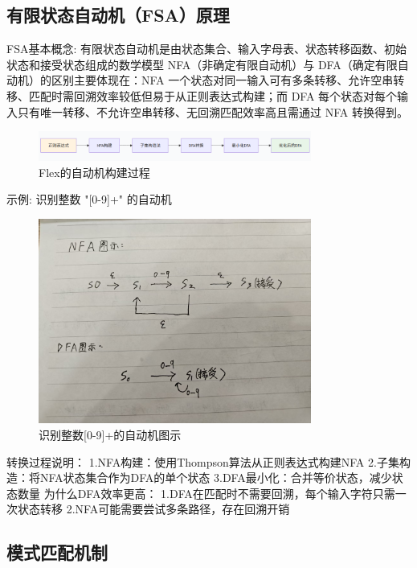 \documentclass[twocolumn]{article}
\begin{document}
\subsection{有限状态自动机（FSA）原理}

FSA基本概念: 有限状态自动机是由状态集合、输入字母表、状态转移函数、初始状态和接受状态组成的数学模型
NFA（非确定有限自动机）与 DFA（确定有限自动机）的区别主要体现在：NFA 一个状态对同一输入可有多条转移、允许空串转移、匹配时需回溯效率较低但易于从正则表达式构建；而 DFA 每个状态对每个输入只有唯一转移、不允许空串转移、无回溯匹配效率高且需通过 NFA 转换得到。

\begin{figure}[htbp]
    \centering
    \includegraphics[width=0.8\textwidth]{Flex_auto_create.png}
    \caption{Flex的自动机构建过程}
    \label{fig:flex_workflow}
\end{figure}

示例: 识别整数 "[0-9]+" 的自动机
\begin{figure}[htbp]
    \centering
    \includegraphics[width=0.8\textwidth]{example1.jpg}
    \caption{识别整数[0-9]+的自动机图示}
    \label{fig:example1}
\end{figure}
转换过程说明：
1.NFA构建：使用Thompson算法从正则表达式构建NFA
2.子集构造：将NFA状态集合作为DFA的单个状态
3.DFA最小化：合并等价状态，减少状态数量
为什么DFA效率更高：
1.DFA在匹配时不需要回溯，每个输入字符只需一次状态转移
2.NFA可能需要尝试多条路径，存在回溯开销

\subsection{模式匹配机制}
\end{document}
